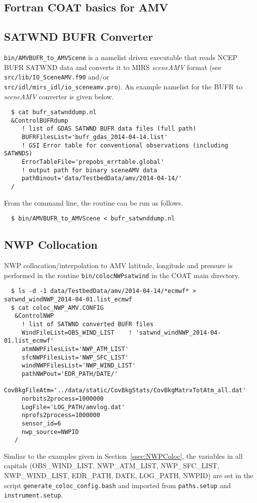 \documentclass[10pt]{report}
\begin{document}
\begin{appendices}
\section{Fortran COAT basics for AMV}
\subsection{SATWND BUFR Converter}
{\tt bin/AMVBUFR\_to\_AMVScene} is a namelist driven executable that reads NCEP BUFR SATWND data and converts it to MIRS {\it sceneAMV} format
 (see {\tt src/lib/IO\_SceneAMV.f90} and/or \\
{\tt src/idl/mirs\_idl/io\_sceneamv.pro}).  An example namelist for the BUFR to {\it sceneAMV} converter 
is given below.
\begin{verbatim}
  $ cat bufr_satwnddump.nl
  &ControlBUFRdump
     ! list of GDAS SATWND BUFR data files (full path)
     BUFRFilesList='bufr_gdas_2014-04-14.list'
     ! GSI Error table for conventional observations (including SATWNDS)
     ErrorTableFile='prepobs_errtable.global'
     ! output path for binary sceneAMV data
     pathBinout='data/TestbedData/amv/2014-04-14/'
  /
\end{verbatim}
From the command line, the routine can be run as follows.
\begin{verbatim}
  $ bin/AMVBUFR_to_AMVScene < bufr_satwnddump.nl 
\end{verbatim}
\subsection{NWP Collocation}
NWP collocation/interpolation to AMV latitude, longitude and pressure is performed in the routine {\tt bin/colocNWPsatwind} in the COAT main directory.
\begin{verbatim}
  $ ls -d -1 data/TestbedData/amv/2014-04-14/*ecmwf* > satwnd_windNWP_2014-04-01.list_ecmwf
  $ cat coloc_NWP_AMV.CONFIG
   &ControlNWP
     ! list of SATWND converted BUFR files
     WindFileList=OBS_WIND_LIST    ! 'satwnd_windNWP_2014-04-01.list_ecmwf'
     atmNWPFilesList='NWP_ATM_LIST'
     sfcNWPFilesList='NWP_SFC_LIST'
     windNWPFilesList='NWP_WIND_LIST'
     pathNWPout='EDR_PATH/DATE/'
     CovBkgFileAtm='../data/static/CovBkgStats/CovBkgMatrxTotAtm_all.dat'
     norbits2process=1000000
     LogFile='LOG_PATH/amvlog.dat'
     nprofs2process=1000000
     sensor_id=6
     nwp_source=NWPID
   /
\end{verbatim}
Simliar to the examples given in Section~\ref{ssec:NWPColoc}, the variables in all 
capitals (OBS\_WIND\_LIST, NWP\_ATM\_LIST, NWP\_SFC\_LIST, NWP\_WIND\_LIST, EDR\_PATH, DATE, 
LOG\_PATH, NWPID) are set in the script {\tt generate\_coloc\_config.bash} and imported from
{\tt paths.setup} and {\tt instrument.setup}.  

\end{appendices}
\end{document}
